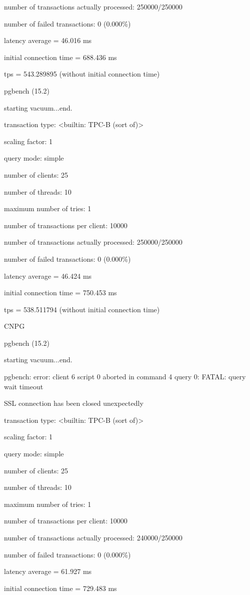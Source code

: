 number of transactions actually processed: 250000/250000

number of failed transactions: 0 (0.000\%)

latency average = 46.016 ms

initial connection time = 688.436 ms

tps = 543.289895 (without initial connection time)

pgbench (15.2)

starting vacuum...end.

transaction type: <builtin: TPC-B (sort of)>

scaling factor: 1

query mode: simple

number of clients: 25

number of threads: 10

maximum number of tries: 1

number of transactions per client: 10000

number of transactions actually processed: 250000/250000

number of failed transactions: 0 (0.000\%)

latency average = 46.424 ms

initial connection time = 750.453 ms

tps = 538.511794 (without initial connection time)

CNPG

pgbench (15.2)

starting vacuum...end.

pgbench: error: client 6 script 0 aborted in command 4 query 0: FATAL:  query wait timeout

SSL connection has been closed unexpectedly

transaction type: <builtin: TPC-B (sort of)>

scaling factor: 1

query mode: simple

number of clients: 25

number of threads: 10

maximum number of tries: 1

number of transactions per client: 10000

number of transactions actually processed: 240000/250000

number of failed transactions: 0 (0.000\%)

latency average = 61.927 ms

initial connection time = 729.483 ms

